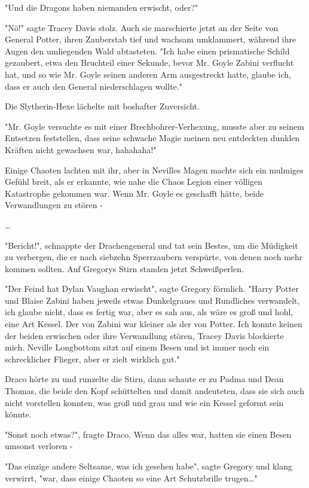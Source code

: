 {"Und die Dragons haben niemanden erwischt, oder?"

"Nö!" sagte Tracey Davis stolz. Auch sie marschierte jetzt an der Seite von General Potter, ihren Zauberstab tief und wachsam umklammert, während ihre Augen den umliegenden Wald abtasteten. "Ich habe einen prismatische Schild gezaubert, etwa den Bruchteil einer Sekunde, bevor Mr. Goyle Zabini verflucht hat, und so wie Mr. Goyle seinen anderen Arm ausgestreckt hatte, glaube ich, dass er auch den General niederschlagen wollte."

Die Slytherin-Hexe lächelte mit boshafter Zuversicht.

"Mr. Goyle versuchte es mit einer Brechbohrer-Verhexung, musste aber zu seinem Entsetzen feststellen, dass seine schwache Magie meinen neu entdeckten dunklen Kräften nicht gewachsen war, hahahaha!"

Einige Chaoten lachten mit ihr, aber in Nevilles Magen machte sich ein mulmiges Gefühl breit, als er erkannte, wie nahe die Chaos Legion einer völligen Katastrophe gekommen war. Wenn Mr. Goyle es geschafft hätte, beide Verwandlungen zu stören -

…

"Bericht!", schnappte der Drachengeneral und tat sein Bestes, um die Müdigkeit zu verbergen, die er nach siebzehn Sperrzaubern verspürte, von denen noch mehr kommen sollten. Auf Gregorys Stirn standen jetzt Schweißperlen.

"Der Feind hat Dylan Vaughan erwischt", sagte Gregory förmlich. "Harry Potter und Blaise Zabini haben jeweils etwas Dunkelgraues und Rundliches verwandelt, ich glaube nicht, dass es fertig war, aber es sah aus, als wäre es groß und hohl, eine Art Kessel. Der von Zabini war kleiner als der von Potter. Ich konnte keinen der beiden erwischen oder ihre Verwandlung stören, Tracey Davis blockierte mich. Neville Longbottom sitzt auf einem Besen und ist immer noch ein schrecklicher Flieger, aber er zielt wirklich gut."

Draco hörte zu und runzelte die Stirn, dann schaute er zu Padma und Dean Thomas, die beide den Kopf schüttelten und damit andeuteten, dass sie sich auch nicht vorstellen konnten, was groß und grau und wie ein Kessel geformt sein könnte.

"Sonst noch etwas?", fragte Draco. Wenn das alles war, hatten sie einen Besen umsonst verloren -

"Das einzige andere Seltsame, was ich gesehen habe", sagte Gregory und klang verwirrt, "war, dass einige Chaoten so eine Art Schutzbrille trugen…"

}
